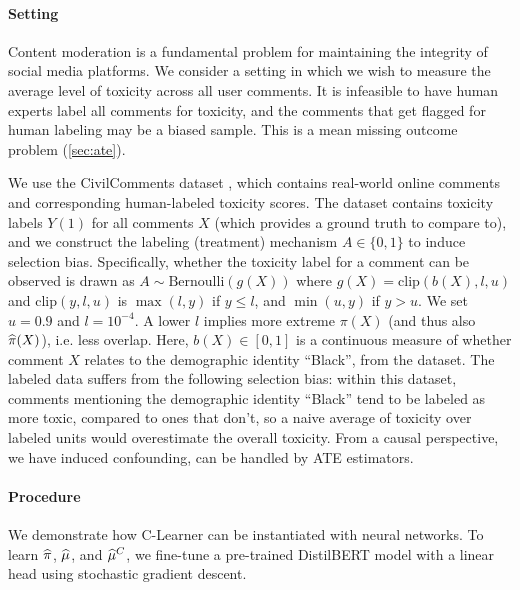 \paragraph{Setting}
Content moderation is a fundamental problem 
for maintaining the integrity of social media platforms. 
We consider a setting in which we wish to
measure the average level of toxicity across all user
comments. 
It is infeasible to have human experts label all comments for 
toxicity, and the comments that 
get flagged for human labeling may be 
a biased sample. 
This is a mean missing outcome problem (\cref{sec:ate}).


We use the CivilComments dataset \citep{civilcomments}, which contains 
real-world online comments and corresponding human-labeled toxicity scores.
The dataset contains toxicity labels $Y(1)$ for all 
comments $X$ (which provides a ground truth to compare to), 
and we construct the labeling (treatment) mechanism $A \in \{0, 1\}$
to induce selection bias.
Specifically, 
whether the toxicity label for a comment can be observed is drawn as 
$    A\sim \textrm{Bernoulli}( g(X) )$ where 
$g(X)=\textrm{clip}(b(X), l, u)$ 
and $\textrm{clip}(y,l,u)$ is $        \max(l,y)$ if $y\leq l$, and $\min(u,y)$ if $y>u$. 
We set $u=0.9$ and $l=10^{-4}$. 
A lower $l$ implies more extreme $\pi(X)$ (and thus also $\widehat{\pi}(X)$), i.e. less overlap. %
Here, $b(X)\in[0,1]$ is a continuous measure of whether comment $X$ relates to the demographic identity ``Black'',
 from the dataset.
The labeled data suffers from the following selection bias: within this dataset, 
comments mentioning the demographic identity ``Black'' tend to be labeled as more toxic, compared to ones that don't, so a naive average of toxicity over labeled units would overestimate the overall toxicity. From a causal perspective, we have induced confounding, can be handled by ATE estimators. %

\paragraph{Procedure}
\ifdefined\pnas
    We demonstrate how C-Learner can be instantiated with neural networks. To learn $\widehat{\pi}$, $\widehat{\mu}$, and $\widehat{\mu}^C$,  we fine-tune a pre-trained DistilBERT model \citep{distilbert} with a linear head using stochastic gradient descent. 
    
